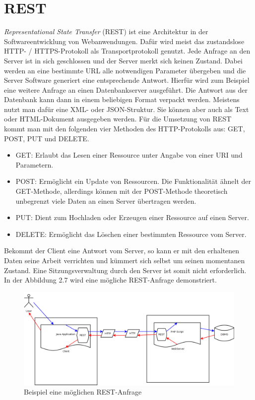 \section{REST}

\emph{Representational State Transfer}\cite{REST:01} (REST) ist eine Architektur in der Softwareentwicklung von Webanwendungen.
Daf\"ur wird meist das zustandslose HTTP- / HTTPS-Protokoll als Transportprotokoll genutzt.
Jede Anfrage an den Server ist in sich geschlossen und der Server merkt sich keinen Zustand.
Dabei werden an eine bestimmte URL alle notwendigen Parameter \"ubergeben und die Server Software generiert eine entsprechende Antwort.
Hierf\"ur wird zum Beispiel eine weitere Anfrage an einen Datenbankserver ausgef\"uhrt. 
Die Antwort aus der Datenbank kann dann in einem beliebigen Format verpackt werden.
Meistens nutzt man daf\"ur eine XML- oder JSON-Struktur.
Sie k\"onnen aber auch als Text oder HTML-Dokument ausgegeben werden.
F\"ur die Umsetzung von REST kommt man mit den folgenden vier Methoden des HTTP-Protokolls aus: GET, POST, PUT und DELETE.\\

\begin{itemize}
 \item GET: Erlaubt das Lesen einer Ressource unter Angabe von einer URI und Parametern.
 \item POST: Erm\"oglicht ein Update von Ressourcen. Die Funktionalit\"at \"ahnelt der GET-Methode,
 allerdings k\"onnen mit der POST-Methode theoretisch unbegrenzt viele Daten an einen Server \"ubertragen werden.
 \item PUT: Dient zum Hochladen oder Erzeugen einer Ressource auf einen Server.
 \item DELETE: Erm\"oglicht das L\"oschen einer bestimmten Ressource vom Server.
\end{itemize}

Bekommt der Client eine Antwort vom Server, so kann er mit den erhaltenen Daten seine Arbeit verrichten und k\"ummert sich selbst um seinen momentanen Zustand. 
Eine Sitzungsverwaltung durch den Server ist somit nicht erforderlich.\\

In der Abbildung 2.7 wird eine m\"ogliche REST-Anfrage demonstriert.
\begin{figure}[h]
  \centering
  \includegraphics[scale=0.4]{diagramme/REST.png}
  \caption{Beispiel eine m\"oglichen REST-Anfrage}
 
\end{figure}

